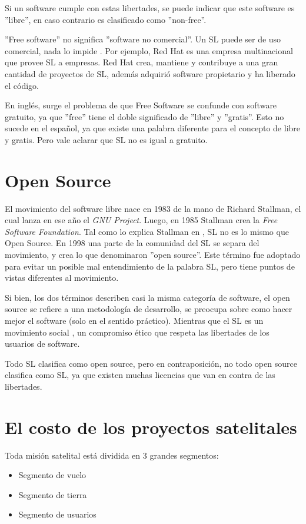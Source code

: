 \documentclass[12pt]{article}
\begin{document}
Si un software cumple con estas libertades, se puede indicar que este software es ''libre'', en caso contrario es clasificado como ''non-free''.

''Free software'' no significa ''software no comercial''. Un SL puede ser de uso comercial, nada lo impide \cite{freesw}. Por ejemplo, Red Hat es una empresa multinacional que provee SL a empresas. Red Hat crea, mantiene y contribuye a una gran cantidad de proyectos de SL, además adquirió software propietario y ha liberado el código. 

En inglés, surge el problema de que Free Software se confunde con software gratuito, ya que ''free'' tiene el doble significado de ''libre'' y ''gratis''. Esto no sucede en el español, ya que existe una palabra diferente para el concepto de libre y gratis. Pero vale aclarar que SL no es igual a gratuito. 


\section{Open Source}
El movimiento del software libre nace en 1983 de la mano de Richard Stallman, el cual lanza en ese año el \textit{GNU Project}. Luego, en 1985 Stallman crea la \textit{Free Software Foundation}. Tal como lo explica Stallman en \cite{richard-open}, SL no es lo mismo que Open Source. En 1998 una parte de la comunidad del SL se separa del movimiento, y crea lo que denominaron ''open source''. Este término fue adoptado para evitar un posible mal entendimiento de la palabra SL, pero tiene puntos de vistas diferentes al movimiento.  

Si bien, los dos términos describen casi la misma categoría de software, el open source se refiere a una metodología de desarrollo, se preocupa sobre como hacer mejor el software (solo en el sentido práctico). Mientras que el SL es un movimiento social \cite{richard-open}, un compromiso ético que respeta las libertades de los usuarios de software. 

Todo SL clasifica como open source, pero en contraposición, no todo open source clasifica como SL, ya que existen muchas licencias que van en contra de las libertades. 

\section{El costo de los proyectos satelitales}
Toda misión satelital está dividida en 3 grandes segmentos:
\begin{itemize}
	\item Segmento de vuelo
	\item Segmento de tierra
	\item Segmento de usuarios
\end{itemize}
\end{document}
